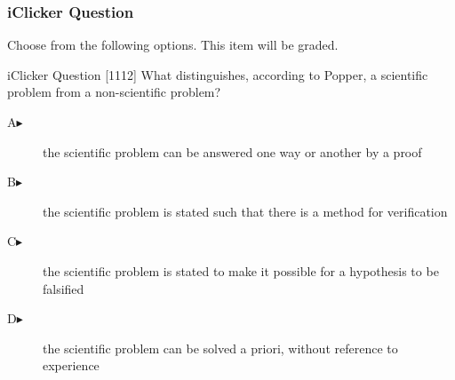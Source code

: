 \begin{frame}
  \frametitle{iClicker Question}
Choose from the following options. This item will be graded.
\begin{block}{iClicker Question}
[1112] What distinguishes, according to Popper, a scientific problem from a
non-scientific problem?
\end{block}
\begin{description}
\item[A\hspace{.2in}$\blacktriangleright$] the scientific problem can
  be answered one way or another by a proof
\item[B\hspace{.2in}$\blacktriangleright$] the scientific problem is
  stated such that there is a method for verification
\item[C\hspace{.2in}$\blacktriangleright$] the scientific problem is
  stated to make it possible for a hypothesis to be falsified
\item[D\hspace{.2in}$\blacktriangleright$] the scientific problem can
  be solved a priori, without reference to experience
\end{description}
\end{frame}
